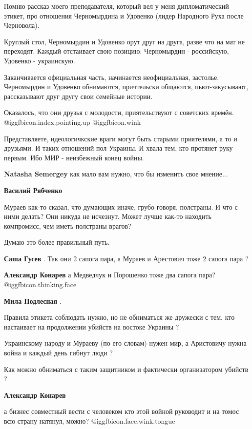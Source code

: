 \begin{itemize}
\begin{itemize}
Помню рассказ моего преподавателя, который вел у меня дипломатический этикет,
про отношения Черномырдина и Удовенко (лидер Народного Руха после Черновола).

Круглый стол, Черномырдин и Удовенко орут друг на друга, разве что на мат не
переходят. Каждый отстаивает свою позицию: Черномырдин - российскую, Удовенко -
украинскую.

Заканчивается официальная часть, начинается неофициальная, застолье.
Черномырдин и Удовенко обнимаются, причтельски общаются, пьют-закусывают,
рассказывают друг другу свои семейные истории.

Оказалось, что они друзья с молодости, приятельствуют с советских времён.
@igg{fbicon.index.pointing.up} @igg{fbicon.wink} 



Представляете, идеологичкские враги могут быть старыми приятелями, а то и
друзьями. И таких отношений пол-Украины. И хвала тем, кто протянет руку первым.
Ибо МИР - неизбежный конец войны.


\textbf{Natasha Semergey} как мало вам нужно, что бы изменить свое мнение...

\textbf{Василий Рябченко} 

Мураев как-то сказал, что думающих иначе, грубо говоря, полстраны. И что с ними
делать? Они никуда не исчезнут. Может лучше как-то находить компромисс, чем
иметь полстраны врагов?

Думаю это более правильный путь.

\textbf{Саша Гусев} .
Так они 2 сапога пара, а Мураев и Арестович тоже 2 сапога пара ?

\textbf{Александр Конарев} а Медведчук и Порошенко тоже два сапога пара? @igg{fbicon.thinking.face} 

\textbf{Мила Подлесная} .

Правила этикета соблюдать нужно, но не обниматься же дружески с тем, кто
настаивает на продолжении убийств на востоке Украины ?

Украинскому народу и Мураеву (по его словам) нужен мир, а Аристовичу нужна
война и каждый день гибнут люди ?

Как можно обниматься с таким защитником и фактически организатором убийств ?


\textbf{Александр Конарев} 

а бизнес совместный вести с человеком кто этой войной руководит и на томос всю
страну натянул, можно? @igg{fbicon.face.wink.tongue}


\end{itemize}
\end{itemize}
